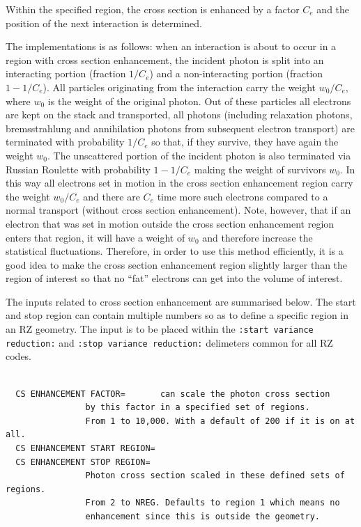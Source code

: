 \documentclass[12pt,twoside]{article}  %
\begin{document}
Within the specified region, the cross section is enhanced by a factor
$C_e$ and the position of the next interaction is determined.

The implementations is as follows: when an interaction is about
to occur in a region with cross section enhancement,
the incident photon is split into an interacting
portion (fraction $1/C_e$) and a non-interacting portion
(fraction $1-1/C_e$). All particles originating from the interaction
carry the weight $w_0/C_e$, where $w_0$ is the weight of the
original photon.
Out of these particles all electrons are kept on the stack
and transported, all photons (including relaxation photons,
bremsstrahlung and annihilation photons from subsequent
electron transport) are terminated with probability $1/C_e$ so that,
if they survive, they have again the weight $w_0$.
The unscattered portion of the incident photon is also terminated
via Russian Roulette with probability $1-1/C_e$ making
the weight of survivors $w_0$.
In this way all electrons set in motion in the
cross section enhancement region carry the weight $w_0/C_e$
and there are $C_e$ time more such electrons compared
to a normal transport (without cross section enhancement).
Note, however, that if an electron that was set in motion outside
the cross section enhancement region enters that region, it will
have a weight of $w_0$ and therefore increase the statistical
fluctuations. Therefore, in order to use this method efficiently,
it is a good idea to make the cross section enhancement region
slightly larger than the region of interest so that no
``fat'' electrons can get into the volume of interest.
 
The inputs related to cross section enhancement are summarised
below. The start and stop region can contain multiple numbers
so as to define a specific region in an RZ geometry. The 
input is to be placed within the 
{\tt :start variance reduction:} and 
{\tt :stop variance reduction:} delimeters common for all 
RZ codes.
 
\begin{verbatim}
 
  CS ENHANCEMENT FACTOR=       can scale the photon cross section
                by this factor in a specified set of regions.
                From 1 to 10,000. With a default of 200 if it is on at all.
  CS ENHANCEMENT START REGION=
  CS ENHANCEMENT STOP REGION=
                Photon cross section scaled in these defined sets of regions.
                From 2 to NREG. Defaults to region 1 which means no
                enhancement since this is outside the geometry.
 
\end{verbatim} 
\end{document}
